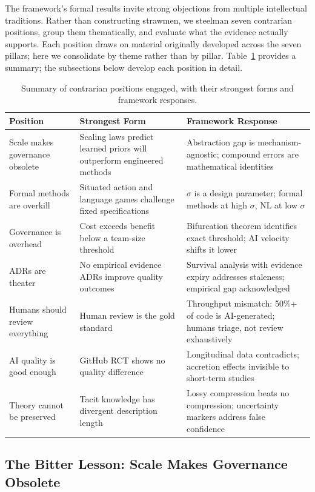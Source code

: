 \documentclass[11pt, a4paper, logo, copyright]{googledeepmind}
\begin{document}
The framework's formal results invite strong objections from multiple intellectual
traditions.  Rather than constructing strawmen, we steelman seven contrarian
positions, group them thematically, and evaluate what the evidence actually
supports.  Each position draws on material originally developed across the
seven pillars; here we consolidate by theme rather than by pillar.  Table~\ref{tab:contrarian-summary} provides a summary; the subsections below
develop each position in detail.

\begin{table}[t]
\centering
\small
\begin{tabular}{lp{4.5cm}p{4.5cm}}
\toprule
\textbf{Position} & \textbf{Strongest Form} & \textbf{Framework Response} \\
\midrule
Scale makes governance obsolete & Scaling laws predict learned priors will outperform engineered methods & Abstraction gap is mechanism-agnostic; compound errors are mathematical identities \\
Formal methods are overkill & Situated action and language games challenge fixed specifications & $\sigma$ is a design parameter; formal methods at high $\sigma$, NL at low $\sigma$ \\
Governance is overhead & Cost exceeds benefit below a team-size threshold & Bifurcation theorem identifies exact threshold; AI velocity shifts it lower \\
ADRs are theater & No empirical evidence ADRs improve quality outcomes & Survival analysis with evidence expiry addresses staleness; empirical gap acknowledged \\
Humans should review everything & Human review is the gold standard & Throughput mismatch: 50\%+ of code is AI-generated; humans triage, not review exhaustively \\
AI quality is good enough & GitHub RCT shows no quality difference & Longitudinal data contradicts; accretion effects invisible to short-term studies \\
Theory cannot be preserved & Tacit knowledge has divergent description length & Lossy compression beats no compression; uncertainty markers address false confidence \\
\bottomrule
\end{tabular}
\caption{Summary of contrarian positions engaged, with their strongest forms and framework responses.}
\label{tab:contrarian-summary}
\end{table}

\subsection{The Bitter Lesson: Scale Makes Governance Obsolete}
\label{sec:contrarian-bitter}
\end{document}
